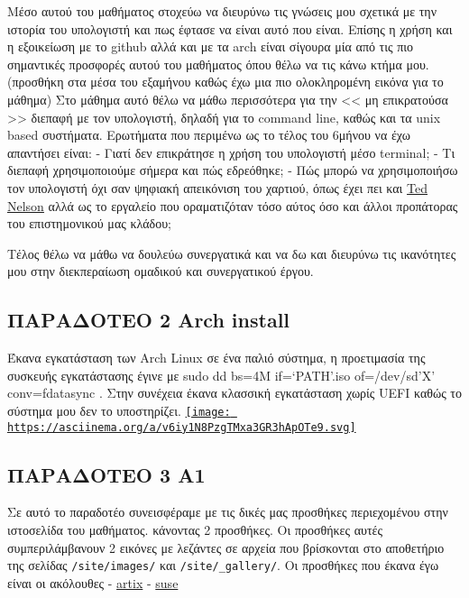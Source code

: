 \documentclass[
]{article}
\begin{document}
Μέσο αυτού του μαθήματος στοχεύω να διευρύνω τις γνώσεις μου σχετικά με
την ιστορία του υπολογιστή και πως έφτασε να είναι αυτό που είναι.
Επίσης η χρήση και η εξοικείωση με το github αλλά και με τα arch είναι
σίγουρα μία από τις πιο σημαντικές προσφορές αυτού του μαθήματος όπου
θέλω να τις κάνω κτήμα μου. (προσθήκη στα μέσα του εξαμήνου καθώς έχω
μια πιο ολοκληρομένη εικόνα για το μάθημα) Στο μάθημα αυτό θέλω να μάθω
περισσότερα για την \textless\textless{} μη επικρατούσα
\textgreater\textgreater{} διεπαφή με τον υπολογιστή, δηλαδή για το
command line, καθώς και τα unix based συστήματα. Ερωτήματα που περιμένω
ως το τέλος του 6μήνου να έχω απαντήσει είναι: - Γιατί δεν επικράτησε η
χρήση του υπολογιστή μέσο terminal; - Τι διεπαφή χρησιμοποιούμε σήμερα
και πώς εδρεόθηκε; - Πώς μπορώ να χρησιμοποιήσω τον υπολογιστή όχι σαν
ψηφιακή απεικόνιση του χαρτιού, όπως έχει πει και
\href{https://en.wikipedia.org/wiki/Ted_Nelson}{Ted Nelson} αλλά ως το
εργαλείο που οραματιζόταν τόσο αύτος όσο και άλλοι προπάτορας του
επιστημονικού μας κλάδου;

Τέλος θέλω να μάθω να δουλεύω συνεργατικά και να δω και διευρύνω τις
ικανότητες μου στην διεκπεραίωση ομαδικού και συνεργατικού έργου.

\hypertarget{ux3c0ux3b1ux3c1ux3b1ux3b4ux3bfux3c4ux3b5ux3bf-2-arch-install}{%
\subsection{ΠΑΡΑΔΟΤΕΟ 2 \textbar{} Arch
install}\label{ux3c0ux3b1ux3c1ux3b1ux3b4ux3bfux3c4ux3b5ux3bf-2-arch-install}}

Έκανα εγκατάσταση των Arch Linux σε ένα παλιό σύστημα, η προετιμασία της
συσκευής εγκατάστασης έγινε με sudo dd bs=4M if=`PATH'.iso of=/dev/sd'X'
conv=fdatasync . Στην συνέχεια έκανα κλασσική εγκατάσταση χωρίς UEFI
καθώς το σύστημα μου δεν το υποστηρίζει.
\href{https://asciinema.org/a/v6iy1N8PzgTMxa3GR3hApOTe9}{\texttt{[image: https://asciinema.org/a/v6iy1N8PzgTMxa3GR3hApOTe9.svg]}}

\hypertarget{ux3c0ux3b1ux3c1ux3b1ux3b4ux3bfux3c4ux3b5ux3bf-3-a1}{%
\subsection{ΠΑΡΑΔΟΤΕΟ 3 \textbar{}
A1}\label{ux3c0ux3b1ux3c1ux3b1ux3b4ux3bfux3c4ux3b5ux3bf-3-a1}}

Σε αυτό το παραδοτέο συνεισφέραμε με τις δικές μας προσθήκες
περιεχομένου στην ιστοσελίδα του μαθήματος. κάνοντας 2 προσθήκες. Οι
προσθήκες αυτές συμπεριλάμβανουν 2 εικόνες με λεζάντες σε αρχεία που
βρίσκονται στο αποθετήριο της σελίδας \texttt{/site/images/} και
\texttt{/site/\_gallery/}. Οι προσθήκες που έκανα έγω είναι οι ακόλουθες
- \href{https://stitc-site.netlify.app/gallery/artix/}{artix} -
\href{https://stitc-site.netlify.app/gallery/suse/}{suse}
\end{document}
